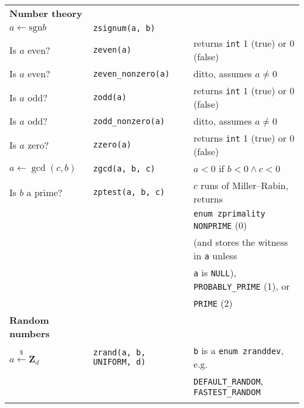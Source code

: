 \documentclass[10pt,draft]{article}
\newcommand{\entry}[3]{ #2 & {\tt #1} & #3 \\ }
\newcommand{\entrycont}[1]{ & & \hspace*{2ex} #1 \\ }
\newcommand{\entryTwo}[4]{\entry{#1}{#2}{#3}\entrycont{#4}}
\newcommand{\entryThree}[5]{\entryTwo{#1}{#2}{#3}{#4}\entrycont{#5}}
\newcommand{\entryFour}[6]{\entryThree{#1}{#2}{#3}{#4}{#5}\entrycont{#6}}
\newcommand{\entryFive}[7]{\entryFour{#1}{#2}{#3}{#4}{#5}{#6}\entrycont{#7}}
\begin{document}
\begin{tabular}{lll}
\textbf{Number theory} \\
\entry    {zsignum(a, b)}     {$a \gets \mbox{sgn} b$} {}
\entry    {zeven(a)}          {Is $a$ even?}           {returns {\tt int} 1 (true) or 0 (false)}
\entry    {zeven\_nonzero(a)} {Is $a$ even?}           {ditto, assumes $a \neq 0$}
\entry    {zodd(a)}           {Is $a$ odd?}            {returns {\tt int} 1 (true) or 0 (false)}
\entry    {zodd\_nonzero(a)}  {Is $a$ odd?}            {ditto, assumes $a \neq 0$}
\entry    {zzero(a)}          {Is $a$ zero?}           {returns {\tt int} 1 (true) or 0 (false)}
\entry    {zgcd(a, b, c)}     {$a \gets \gcd(c, b)$}   {$a < 0$ if $b < 0 \wedge c < 0$}
\entryFive{zptest(a, b, c)}   {Is $b$ a prime?}        {$c$ runs of Miller--Rabin, returns}
                                                       {{\tt enum zprimality} {\tt NONPRIME} (0)}
                                                       {(and stores the witness in {\tt a} unless}
                                                       {{\tt a} is {\tt NULL}), {\tt PROBABLY\_PRIME} (1), or}
                                                       {{\tt PRIME} (2)}

\textbf{Random numbers} \\
\entryTwo{zrand(a, b, UNIFORM, d)} {$a \xleftarrow{\$} \textbf{Z}_d$}
         {{\tt b} is a {\tt enum zranddev}, e.g.}
         {{\tt DEFAULT\_RANDOM}, {\tt FASTEST\_RANDOM}}
\\



\end{tabular}
\end{document}
